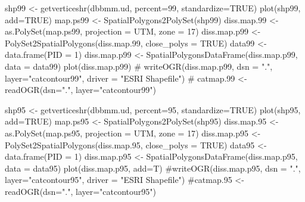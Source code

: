 \documentclass[
  letterpaper,
]{book}
\newenvironment{Shaded}{\begin{snugshade}}{\end{snugshade}}
\newcommand{\AttributeTok}[1]{\textcolor[rgb]{0.40,0.45,0.13}{#1}}
\newcommand{\CommentTok}[1]{\textcolor[rgb]{0.37,0.37,0.37}{#1}}
\newcommand{\ConstantTok}[1]{\textcolor[rgb]{0.56,0.35,0.01}{#1}}
\newcommand{\DecValTok}[1]{\textcolor[rgb]{0.68,0.00,0.00}{#1}}
\newcommand{\FloatTok}[1]{\textcolor[rgb]{0.68,0.00,0.00}{#1}}
\newcommand{\FunctionTok}[1]{\textcolor[rgb]{0.28,0.35,0.67}{#1}}
\newcommand{\NormalTok}[1]{\textcolor[rgb]{0.00,0.23,0.31}{#1}}
\newcommand{\OtherTok}[1]{\textcolor[rgb]{0.00,0.23,0.31}{#1}}
\newcommand{\StringTok}[1]{\textcolor[rgb]{0.13,0.47,0.30}{#1}}
\begin{document}
\begin{Shaded}
\begin{Highlighting}[]
\NormalTok{shp99 }\OtherTok{\textless{}{-}} \FunctionTok{getverticeshr}\NormalTok{(dbbmm.ud, }\AttributeTok{percent=}\DecValTok{99}\NormalTok{, }\AttributeTok{standardize=}\ConstantTok{TRUE}\NormalTok{)}
\FunctionTok{plot}\NormalTok{(shp99, }\AttributeTok{add=}\ConstantTok{TRUE}\NormalTok{)}
\NormalTok{map.ps99 }\OtherTok{\textless{}{-}} \FunctionTok{SpatialPolygons2PolySet}\NormalTok{(shp99)}
\NormalTok{diss.map}\FloatTok{.99} \OtherTok{\textless{}{-}} \FunctionTok{as.PolySet}\NormalTok{(map.ps99, }\AttributeTok{projection =} \StringTok{\textquotesingle{}UTM\textquotesingle{}}\NormalTok{, }\AttributeTok{zone =} \StringTok{\textquotesingle{}17\textquotesingle{}}\NormalTok{)}
\NormalTok{diss.map.p99 }\OtherTok{\textless{}{-}} \FunctionTok{PolySet2SpatialPolygons}\NormalTok{(diss.map}\FloatTok{.99}\NormalTok{, }\AttributeTok{close\_polys =} \ConstantTok{TRUE}\NormalTok{)}
\NormalTok{data99 }\OtherTok{\textless{}{-}} \FunctionTok{data.frame}\NormalTok{(}\AttributeTok{PID =} \DecValTok{1}\NormalTok{)}
\NormalTok{diss.map.p99 }\OtherTok{\textless{}{-}} \FunctionTok{SpatialPolygonsDataFrame}\NormalTok{(diss.map.p99, }\AttributeTok{data =}\NormalTok{ data99)}
\FunctionTok{plot}\NormalTok{(diss.map.p99)}
\CommentTok{\# writeOGR(diss.map.p99, dsn = ".", layer="catcontour99", driver = "ESRI Shapefile")}
\CommentTok{\# catmap.99 \textless{}{-} readOGR(dsn=".", layer="catcontour99")}

\NormalTok{shp95 }\OtherTok{\textless{}{-}} \FunctionTok{getverticeshr}\NormalTok{(dbbmm.ud, }\AttributeTok{percent=}\DecValTok{95}\NormalTok{, }\AttributeTok{standardize=}\ConstantTok{TRUE}\NormalTok{)}
\FunctionTok{plot}\NormalTok{(shp95, }\AttributeTok{add=}\ConstantTok{TRUE}\NormalTok{)}
\NormalTok{map.ps95 }\OtherTok{\textless{}{-}} \FunctionTok{SpatialPolygons2PolySet}\NormalTok{(shp95)}
\NormalTok{diss.map}\FloatTok{.95} \OtherTok{\textless{}{-}} \FunctionTok{as.PolySet}\NormalTok{(map.ps95, }\AttributeTok{projection =} \StringTok{\textquotesingle{}UTM\textquotesingle{}}\NormalTok{, }\AttributeTok{zone =} \StringTok{\textquotesingle{}17\textquotesingle{}}\NormalTok{)}
\NormalTok{diss.map.p95 }\OtherTok{\textless{}{-}} \FunctionTok{PolySet2SpatialPolygons}\NormalTok{(diss.map}\FloatTok{.95}\NormalTok{, }\AttributeTok{close\_polys =} \ConstantTok{TRUE}\NormalTok{)}
\NormalTok{data95 }\OtherTok{\textless{}{-}} \FunctionTok{data.frame}\NormalTok{(}\AttributeTok{PID =} \DecValTok{1}\NormalTok{)}
\NormalTok{diss.map.p95 }\OtherTok{\textless{}{-}} \FunctionTok{SpatialPolygonsDataFrame}\NormalTok{(diss.map.p95, }\AttributeTok{data =}\NormalTok{ data95)}
\FunctionTok{plot}\NormalTok{(diss.map.p95, }\AttributeTok{add=}\NormalTok{T)}
\CommentTok{\#writeOGR(diss.map.p95, dsn = ".", layer="catcontour95", driver = "ESRI Shapefile")}
\CommentTok{\#catmap.95 \textless{}{-} readOGR(dsn=".", layer="catcontour95")}


\end{Highlighting}
\end{Shaded}
\end{document}
